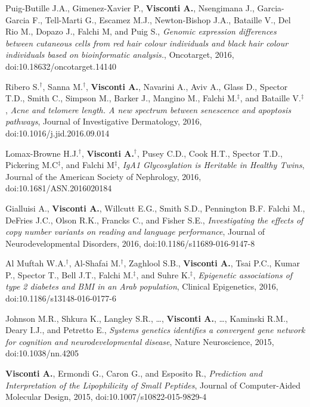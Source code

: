 {\begin{itemize}
		 Puig-Butille J.A., Gimenez-Xavier P., \textbf{Visconti A.}, Nsengimana J., Garcia-Garcia F., Tell-Marti G., Escamez M.J., Newton-Bishop J.A., Bataille V., Del Rio M., Dopazo J., Falchi M, and Puig S., \emph{Genomic expression differences between cutaneous cells from red hair colour individuals and black hair colour individuals based on bioinformatic analysis.}, Oncotarget, 2016, doi:10.18632/oncotarget.14140

		 Ribero S.$^{\textbf{$\dag $}}$, Sanna M.$^{\textbf{$\dag $}}$, \textbf{Visconti A.}, Navarini A., Aviv A., Glass D., Spector T.D., Smith C., Simpson M., Barker J., Mangino M., Falchi M.$^{\textbf{$\ddag $}}$, and Bataille V.$^{\textbf{$\ddag $}}$, \emph{Acne and telomere length. A new spectrum between senescence and apoptosis pathways}, Journal of Investigative Dermatology, 2016, doi:10.1016/j.jid.2016.09.014

		 Lomax-Browne H.J.$^{\textbf{$\dag $}}$, \textbf{Visconti A.}$^{\textbf{$\dag $}}$, Pusey C.D., Cook H.T., Spector T.D., Pickering M.C$^{\textbf{$\ddag $}}$, and Falchi M$^{\textbf{$\ddag $}}$, \emph{IgA1 Glycosylation is Heritable in Healthy Twins}, Journal of the American Society of Nephrology, 2016, doi:10.1681/ASN.2016020184

		 Gialluisi A., \textbf{Visconti A.}, Willcutt E.G., Smith S.D., Pennington B.F. Falchi M., DeFries J.C.,  Olson R.K., Francks C., and Fisher S.E., \emph{Investigating the effects of copy number variants on reading and language performance}, Journal of Neurodevelopmental Disorders, 2016, doi:10.1186/s11689-016-9147-8

		 Al Muftah W.A.$^{\textbf{$\dag $}}$, Al-Shafai M.$^{\textbf{$\dag $}}$, Zaghlool S.B., \textbf{Visconti A.}, Tsai P.C., Kumar P., Spector T., Bell J.T., Falchi M.$^{\textbf{$\ddag $}}$, and Suhre K.$^{\textbf{$\ddag $}}$, \emph{Epigenetic associations of type 2 diabetes and BMI in an Arab population}, Clinical Epigenetics, 2016, doi:10.1186/s13148-016-0177-6
		
		 Johnson M.R., Shkura K., Langley S.R., \dots, \textbf{Visconti A.}, \dots, Kaminski R.M., Deary I.J., and Petretto E., \emph{Systems genetics identifies a convergent gene network for cognition and neurodevelopmental disease}, Nature Neuroscience, 2015, doi:10.1038/nn.4205

		 \textbf{Visconti A.}, Ermondi G., Caron G., and Esposito R., \emph{Prediction and Interpretation of the Lipophilicity of Small Peptides}, Journal of Computer-Aided Molecular Design, 2015, doi:10.1007/s10822-015-9829-4
		

\end{itemize}}
